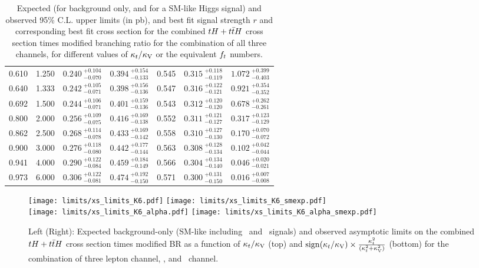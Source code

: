 \begin{table}[h!]
\begin{tabular}{rr|ccc|cc}
         0.610 &  1.250 & $0.240~_{-0.070}^{+0.104}$ & $0.394~_{-0.133}^{+0.154}$ & 0.545 & $0.315~_{-0.119}^{+0.118}$ & $1.072~_{-0.403}^{+0.399}$ \\
         0.640 &  1.333 & $0.242~_{-0.071}^{+0.105}$ & $0.398~_{-0.136}^{+0.156}$ & 0.547 & $0.316~_{-0.121}^{+0.122}$ & $0.921~_{-0.352}^{+0.354}$ \\
         0.692 &  1.500 & $0.244~_{-0.071}^{+0.106}$ & $0.401~_{-0.136}^{+0.159}$ & 0.543 & $0.312~_{-0.120}^{+0.120}$ & $0.678~_{-0.261}^{+0.262}$ \\
         0.800 &  2.000 & $0.256~_{-0.075}^{+0.109}$ & $0.416~_{-0.138}^{+0.169}$ & 0.552 & $0.311~_{-0.127}^{+0.121}$ & $0.317~_{-0.129}^{+0.123}$ \\
         0.862 &  2.500 & $0.268~_{-0.078}^{+0.114}$ & $0.433~_{-0.142}^{+0.169}$ & 0.558 & $0.310~_{-0.130}^{+0.127}$ & $0.170~_{-0.072}^{+0.070}$ \\
         0.900 &  3.000 & $0.276~_{-0.080}^{+0.118}$ & $0.442~_{-0.144}^{+0.177}$ & 0.563 & $0.308~_{-0.134}^{+0.128}$ & $0.102~_{-0.044}^{+0.042}$ \\
         0.941 &  4.000 & $0.290~_{-0.084}^{+0.122}$ & $0.459~_{-0.149}^{+0.184}$ & 0.566 & $0.304~_{-0.140}^{+0.134}$ & $0.046~_{-0.021}^{+0.020}$ \\
         0.973 &  6.000 & $0.306~_{-0.081}^{+0.122}$ & $0.474~_{-0.150}^{+0.192}$ & 0.571 & $0.300~_{-0.150}^{+0.131}$ & $0.016~_{-0.008}^{+0.007}$ \\
    \hline
  \end{tabular}
  \caption[Expected and observed upper limits.]{Expected (for background only, and for a SM-like Higgs signal) and observed 95\% C.L. upper limits (in pb), and best fit signal strength $r$ and corresponding best fit cross section for the combined $\tH+\ttH$ cross section times modified branching ratio for the combination of all three channels, for different values of $\kappa_t/\kappa_\text{V}$ or the equivalent $f_t$ numbers.}
  \label{tab:xslimits}
\end{table}

\begin{figure} [!h]
 \centering
 \texttt{[image: limits/xs\_limits\_K6.pdf]}
 \texttt{[image: limits/xs\_limits\_K6\_smexp.pdf]} \\  
 \texttt{[image: limits/xs\_limits\_K6\_alpha.pdf]}
 \texttt{[image: limits/xs\_limits\_K6\_alpha\_smexp.pdf]} 
\caption[Asymptotic limits on the combined $\tH+\ttH$ $\sigma\times$BR]{Left (Right): Expected background-only (SM-like including  \ttH\ and \tH\ signals) and observed asymptotic limits on the combined $\tH+\ttH$ cross section times modified BR as a function of $\kappa_t/\kappa_\text{V}$ (top) and $\mathrm{sign}(\kappa_t/\kappa_\text{V})\times\frac{\kappa_t^2}{(\kappa_t^2+\kappa_\text{V}^2)}$ (bottom) for the combination of three lepton channel, \mumu, and \emu\ channel. }
\label{fig:xs_limits}
\end{figure}

